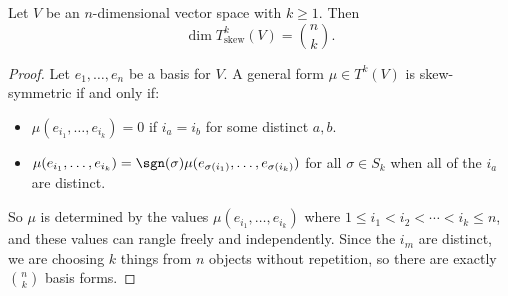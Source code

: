 \documentclass[11pt,letterpaper]{article}
\begin{document}
\begin{proposition}\label{dimskew}
  Let $V$ be an $n$-dimensional vector space with $k\geq 1$. Then
  \[
    \dim T^k_{\mathrm{skew}}(V) = \binom{n}{k}
  .\]   
\end{proposition}
\begin{proof}
  Let $e_1,\ldots, e_n$ be a basis for $V$. A general form $\mu\in T^k(V)$ is skew-symmetric if and only if:
  \begin{itemize}
    \item $\mu(e_{i_1},\ldots,e_{i_k})=0$ if $i_a=i_b$ for some distinct $a,b$.
    \item $\mu(e_{i_1},\ldots,e_{i_k})=\sgn(\sigma)\mu(e_{\sigma(i_1)},\ldots,e_{\sigma(i_k)})$ for all $\sigma\in S_k$ when all of the $i_a$ are distinct. 
  \end{itemize}
  So $\mu$ is determined by the values $\mu(e_{i_1},\ldots, e_{i_k})$ where $1\leq i_1< i_2<\cdots< i_k\leq n$, and these values can rangle freely and independently. Since the $i_m$ are distinct, we are choosing $k$ things from $n$ objects without repetition, so there are exactly $\binom{n}{k}$ basis forms. 
\end{proof}
\end{document}
